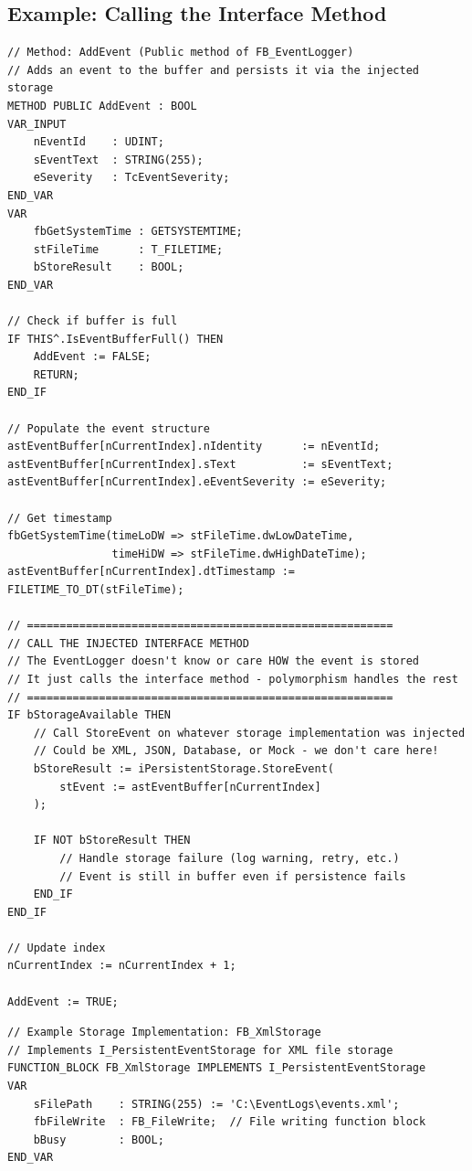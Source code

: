 \documentclass[11pt,a4paper]{article}
\begin{document}
\subsection*{Example: Calling the Interface Method}

\begin{lstlisting}
// Method: AddEvent (Public method of FB_EventLogger)
// Adds an event to the buffer and persists it via the injected storage
METHOD PUBLIC AddEvent : BOOL
VAR_INPUT
    nEventId    : UDINT;
    sEventText  : STRING(255);
    eSeverity   : TcEventSeverity;
END_VAR
VAR
    fbGetSystemTime : GETSYSTEMTIME;
    stFileTime      : T_FILETIME;
    bStoreResult    : BOOL;
END_VAR

// Check if buffer is full
IF THIS^.IsEventBufferFull() THEN
    AddEvent := FALSE;
    RETURN;
END_IF

// Populate the event structure
astEventBuffer[nCurrentIndex].nIdentity      := nEventId;
astEventBuffer[nCurrentIndex].sText          := sEventText;
astEventBuffer[nCurrentIndex].eEventSeverity := eSeverity;

// Get timestamp
fbGetSystemTime(timeLoDW => stFileTime.dwLowDateTime,
                timeHiDW => stFileTime.dwHighDateTime);
astEventBuffer[nCurrentIndex].dtTimestamp := FILETIME_TO_DT(stFileTime);

// ========================================================
// CALL THE INJECTED INTERFACE METHOD
// The EventLogger doesn't know or care HOW the event is stored
// It just calls the interface method - polymorphism handles the rest
// ========================================================
IF bStorageAvailable THEN
    // Call StoreEvent on whatever storage implementation was injected
    // Could be XML, JSON, Database, or Mock - we don't care here!
    bStoreResult := iPersistentStorage.StoreEvent(
        stEvent := astEventBuffer[nCurrentIndex]
    );
    
    IF NOT bStoreResult THEN
        // Handle storage failure (log warning, retry, etc.)
        // Event is still in buffer even if persistence fails
    END_IF
END_IF

// Update index
nCurrentIndex := nCurrentIndex + 1;

AddEvent := TRUE;
\end{lstlisting}

\begin{lstlisting}
// Example Storage Implementation: FB_XmlStorage
// Implements I_PersistentEventStorage for XML file storage
FUNCTION_BLOCK FB_XmlStorage IMPLEMENTS I_PersistentEventStorage
VAR
    sFilePath    : STRING(255) := 'C:\EventLogs\events.xml';
    fbFileWrite  : FB_FileWrite;  // File writing function block
    bBusy        : BOOL;
END_VAR
\end{lstlisting}
\end{document}
